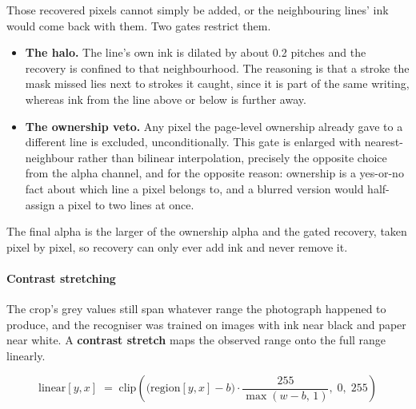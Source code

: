 Those recovered pixels cannot simply be added, or the neighbouring lines' ink would come back with them. Two gates restrict them.


\begin{itemize}\setlength\itemsep{0pt}
  \item \textbf{The halo.} The line's own ink is dilated by about 0.2 pitches and the recovery is confined to that neighbourhood. The reasoning is that a stroke the mask missed lies next to strokes it caught, since it is part of the same writing, whereas ink from the line above or below is further away.
  \item \textbf{The ownership veto.} Any pixel the page-level ownership already gave to a different line is excluded, unconditionally. This gate is enlarged with nearest-neighbour rather than bilinear interpolation, precisely the opposite choice from the alpha channel, and for the opposite reason: ownership is a yes-or-no fact about which line a pixel belongs to, and a blurred version would half-assign a pixel to two lines at once.
\end{itemize}
The final alpha is the larger of the ownership alpha and the gated recovery, taken pixel by pixel, so recovery can only ever add ink and never remove it.


\paragraph{Contrast stretching}
The crop's grey values still span whatever range the photograph happened to produce, and the recogniser was trained on images with ink near black and paper near white. A \textbf{contrast stretch} maps the observed range onto the full range linearly.


\begin{equation}
\mathrm{linear}[y,x] \;=\; \mathrm{clip}\!\left(\big(\mathrm{region}[y,x] - b\big)\cdot\frac{255}{\max(w - b,\,1)},\; 0,\; 255\right)
\end{equation}

